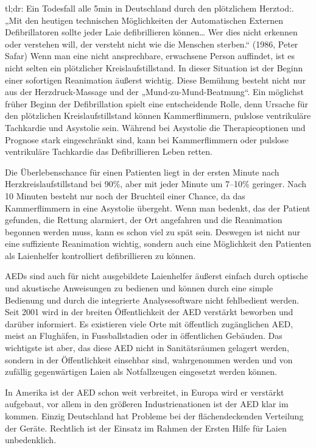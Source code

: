 tl;dr: Ein Todesfall alle 5min in Deutschland durch den plötzlichem Herztod:. „Mit den heutigen technischen Möglichkeiten der Automatischen Externen Defibrillatoren sollte jeder Laie defibrillieren können\ldots{} Wer dies nicht erkennen oder verstehen will, der versteht nicht wie die Menschen sterben.`` (1986, Peter Safar) Wenn man eine nicht ansprechbare, erwachsene Person auffindet, ist es nicht selten ein plötzlicher Kreislaufstillstand. In dieser Situation ist der Beginn einer sofortigen Reanimation äußerst wichtig. Diese Bemühung besteht nicht nur aus der Herzdruck-Massage und der „Mund-zu-Mund-Beatmung``. Ein möglichst früher Beginn der Defibrillation spielt eine entscheidende Rolle, denn Ursache für den plötzlichen Kreislaufstillstand können Kammerflimmern, pulslose ventrikuläre Tachkardie und Asystolie sein. Während bei Asystolie die Therapieoptionen und Prognose stark eingeschränkt sind, kann bei Kammerflimmern oder pulslose ventrikuläre Tachkardie das Defibrillieren Leben retten.

Die Überlebenschance für einen Patienten liegt in der ersten Minute nach Herzkreislaufstillstand bei 90\%, aber mit jeder Minute um 7--10\% geringer. Nach 10 Minuten besteht nur noch der Bruchteil einer Chance, da das Kammerflimmern in eine Asystolie übergeht. Wenn man bedenkt, das der Patient gefunden, die Rettung alarmiert, der Ort angefahren und die Reanimation begonnen werden muss, kann es schon viel zu spät sein. Deswegen ist nicht nur eine suffiziente Reanimation wichtig, sondern auch eine Möglichkeit den Patienten als Laienhelfer kontrolliert defibrillieren zu können.

AEDs sind auch für nicht ausgebildete Laienhelfer äußerst einfach durch optische und akustische Anweisungen zu bedienen und können durch eine simple Bedienung und durch die integrierte Analysesoftware nicht fehlbedient werden. Seit 2001 wird in der breiten Öffentlichkeit der AED verstärkt beworben und darüber informiert. Es existieren viele Orte mit öffentlich zugänglichen AED, meist an Flughäfen, in Fussballstadien oder in öffentlichen Gebäuden. Das wichtigste ist aber, das diese AED nicht in Sanitätsräumen gelagert werden, sondern in der Öffentlichkeit einsehbar sind, wahrgenommen werden und von zufällig gegenwärtigen Laien als Notfallzeugen eingesetzt werden können.

In Amerika ist der AED schon weit verbreitet, in Europa wird er verstärkt aufgebaut, vor allem in den größeren Industrienationen ist der AED klar im kommen. Einzig Deutschland hat Probleme bei der flächendeckenden Verteilung der Geräte. Rechtlich ist der Einsatz im Rahmen der Ersten Hilfe für Laien unbedenklich.

